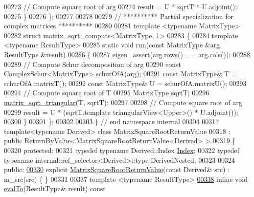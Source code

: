 \begin{DoxyCode}
00273     \textcolor{comment}{// Compute square root of arg}
00274     result = U * sqrtT * U.adjoint();
00275   \}
00276 \};
00277 
00278 
00279 \textcolor{comment}{// ********** Partial specialization for complex matrices **********}
00280 
00281 \textcolor{keyword}{template} <\textcolor{keyword}{typename} MatrixType>
00282 \textcolor{keyword}{struct }matrix\_sqrt\_compute<MatrixType, 1>
00283 \{
00284   \textcolor{keyword}{template} <\textcolor{keyword}{typename} ResultType>
00285   \textcolor{keyword}{static} \textcolor{keywordtype}{void} run(\textcolor{keyword}{const} MatrixType &arg, ResultType &result)
00286   \{
00287     eigen\_assert(arg.rows() == arg.cols());
00288 
00289     \textcolor{comment}{// Compute Schur decomposition of arg}
00290     \textcolor{keyword}{const} ComplexSchur<MatrixType> schurOfA(arg);  
00291     \textcolor{keyword}{const} MatrixType& T = schurOfA.matrixT();
00292     \textcolor{keyword}{const} MatrixType& U = schurOfA.matrixU();
00293     
00294     \textcolor{comment}{// Compute square root of T}
00295     MatrixType sqrtT;
00296     \hyperlink{namespace_eigen_ae51c91f920f6ea4a7f6f72caa1e8249f}{matrix\_sqrt\_triangular}(T, sqrtT);
00297     
00298     \textcolor{comment}{// Compute square root of arg}
00299     result = U * (sqrtT.template triangularView<Upper>() * U.adjoint());
00300   \}
00301 \};
00302 
00303 \} \textcolor{comment}{// end namespace internal}
00304 
00317 \textcolor{keyword}{template}<\textcolor{keyword}{typename} Derived> \textcolor{keyword}{class }MatrixSquareRootReturnValue
00318 : \textcolor{keyword}{public} ReturnByValue<MatrixSquareRootReturnValue<Derived> >
00319 \{
00320   \textcolor{keyword}{protected}:
00321     \textcolor{keyword}{typedef} \textcolor{keyword}{typename} Derived::Index \hyperlink{namespace_eigen_a62e77e0933482dafde8fe197d9a2cfde}{Index};
00322     \textcolor{keyword}{typedef} \textcolor{keyword}{typename} internal::ref\_selector<Derived>::type DerivedNested;
00323 
00324   \textcolor{keyword}{public}:
\hyperlink{class_eigen_1_1_matrix_square_root_return_value_aa27fd0e59ff1711a55ee8a4342c035d5}{00330}     \textcolor{keyword}{explicit} \hyperlink{class_eigen_1_1_matrix_square_root_return_value_aa27fd0e59ff1711a55ee8a4342c035d5}{MatrixSquareRootReturnValue}(\textcolor{keyword}{const} Derived& src) : m\_src(src) \{ \}
00331 
00337     \textcolor{keyword}{template} <\textcolor{keyword}{typename} ResultType>
\hyperlink{class_eigen_1_1_matrix_square_root_return_value_a97577165569edcf19429c7748b670e51}{00338}     \textcolor{keyword}{inline} \textcolor{keywordtype}{void} \hyperlink{class_eigen_1_1_matrix_square_root_return_value_a97577165569edcf19429c7748b670e51}{evalTo}(ResultType& result)\textcolor{keyword}{ const}

\end{DoxyCode}

